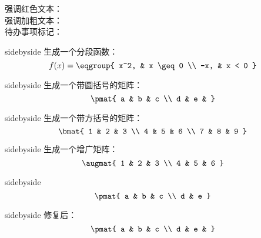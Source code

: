 强调红色文本： \\
强调加粗文本： \\
待办事项标记： \\

\begin{tcblisting}{sidebyside}
	生成一个分段函数：
	\[
	f(x) = \eqgroup{
		x^2, & x \geq 0 \\
		-x, & x < 0
	}
	\]
\end{tcblisting}

\begin{tcblisting}{sidebyside}
	生成一个带圆括号的矩阵：
	\[
	\pmat{
		a & b & c \\
		d & e &   %
	}
	\]
\end{tcblisting}
\begin{tcblisting}{sidebyside}
	生成一个带方括号的矩阵：
	\[
	\bmat{
		1 & 2 & 3 \\
		4 & 5 & 6 \\
		7 & 8 & 9
	}
	\]
	
\end{tcblisting}
\begin{tcblisting}{sidebyside}
	生成一个增广矩阵：
	\[
	\augmat{
		1 & 2 & 3 \\  %
		4 & 5 & 6     %
	}
	\]
\end{tcblisting}
\begin{tcblisting}{sidebyside}
	\[
	\pmat{
		a & b & c \\ %
		d & e       %
	}
	\]
\end{tcblisting}
\begin{tcblisting}{sidebyside}
	修复后：
	\[
	\pmat{
		a & b & c \\
		d & e &   %
	}
	\]
	
\end{tcblisting}

